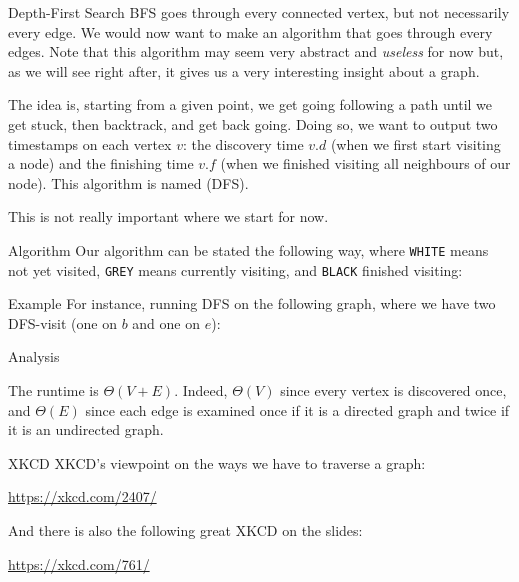 \documentclass[a4paper]{article}
\begin{document}
\begin{parag}{Depth-First Search}
    BFS goes through every connected vertex, but not necessarily every edge. We would now want to make an algorithm that goes through every edges. Note that this algorithm may seem very abstract and \textit{useless} for now but, as we will see right after, it gives us a very interesting insight about a graph.

    The idea is, starting from a given point, we get going following a path until we get stuck, then backtrack, and get back going. Doing so, we want to output two timestamps on each vertex $v$: the discovery time $v.d$ (when we first start visiting a node) and the finishing time $v.f$ (when we finished visiting all neighbours of our node). This algorithm is named  (DFS).
    
    This is not really important where we start for now.

    \begin{subparag}{Algorithm}
        Our algorithm can be stated the following way, where \texttt{WHITE} means not yet visited, \texttt{GREY} means currently visiting, and \texttt{BLACK} finished visiting:
    \end{subparag}

    \begin{subparag}{Example}
        For instance, running DFS on the following graph, where we have two DFS-visit (one on $b$ and one on $e$):
    \end{subparag}

    \begin{subparag}{Analysis}

        The runtime is $\Theta\left(V + E\right)$. Indeed, $\Theta\left(V\right)$ since every vertex is discovered once, and $\Theta\left(E\right)$ since each edge is examined once if it is a directed graph and twice if it is an undirected graph.
    \end{subparag}

    \begin{subparag}{XKCD}
        XKCD's viewpoint on the ways we have to traverse a graph:
        \begin{center}
            \url{https://xkcd.com/2407/}
        \end{center}

        And there is also the following great XKCD on the slides:
        \begin{center}
            \url{https://xkcd.com/761/}
        \end{center}
    \end{subparag}
\end{parag}
\end{document}
